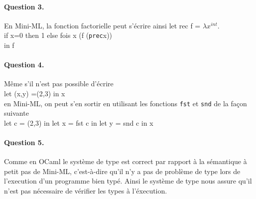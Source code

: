 \documentclass{article}
\theoremstyle{thm}
\theoremstyle{def}
\theoremstyle{dem}
\newcommand{\code}[1]{\texttt{#1}}
\begin{document}
	\paragraph{Question 3.}
	En Mini-ML, la fonction factorielle peut s'écrire ainsi
	let rec f = $\lambda x^{int}$.\\
	if x=0 then 1 else fois x (f (\code{prec}x))\\
	in f\\

	\paragraph{Question 4.}
	Même s'il n'est pas possible d'écrire\\
	let (x,y) =(2,3) in x\\
	en Mini-ML, on peut s'en sortir en utilisant les fonctions \code{fst} et \code{snd} de la façon suivante\\
	let c = (2,3) in let x = fst c in let y = snd c in x

	\paragraph{Question 5.}
	Comme en OCaml le système de type est correct par rapport à la sémantique à petit pas de Mini-ML, c'est-à-dire qu'il n'y a pas de problème de type lors de l'execution d'un programme bien typé. Ainsi le système de type nous assure qu'il n'est pas nécessaire de vérifier les types à l'éxecution.
\end{document}
